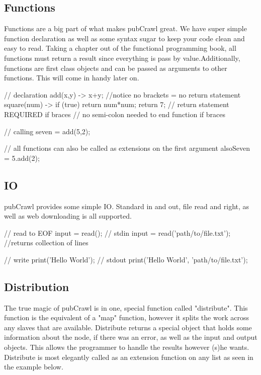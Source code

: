 \documentclass[letterpaper]{article}
\begin{document}
\subsection{Functions}
Functions are a big part of what makes pubCrawl great. We have super simple function declaration as well as some syntax sugar to keep your code clean and easy to read. Taking a chapter out of the functional programming book, all functions must return a result since everything is pass by value.Additionally, functions are first class objects and can be passed as arguments to other functions. This will come in handy later on.\\[6em]

\begin{mdframed}[hidealllines=true,backgroundcolor=gray!10,skipbelow=1em,skipabove=.5em]
\begin{code}
// declaration
add(x,y) -> x+y; //notice no brackets = no return statement
square(num) -> {
	if (true) {
		return num*num;
	}
	return 7; // return statement REQUIRED if braces
} // no semi-colon needed to end function if braces

// calling
seven = add(5,2);

// all functions can also be called as extensions on the first argument
alsoSeven = 5.add(2);
\end{code}
\end{mdframed}
\subsection{IO}
pubCrawl provides some simple IO. Standard in and out, file read and right, as well as web downloading is all supported.

\begin{mdframed}[hidealllines=true,backgroundcolor=gray!10,skipbelow=1em,skipabove=.5em]
\begin{code}
// read to EOF
input = read(); // stdin
input = read('path/to/file.txt'); //returns collection of lines

// write
print('Hello World'); // stdout
print('Hello World', 'path/to/file.txt');
\end{code}
\end{mdframed}

\subsection{Distribution}
The true magic of pubCrawl is in one, special function called "distribute". This function is the equivalent of a "map" function, however it splits the work across any slaves that are available. Distribute returns a special object that holds some information about the node, if there was an error, as well as the input and output objects. This allows the programmer to handle the results however (s)he wants. Distribute is most elegantly called as an extension function on any list as seen in the example below.\\[6em]
\end{document}
